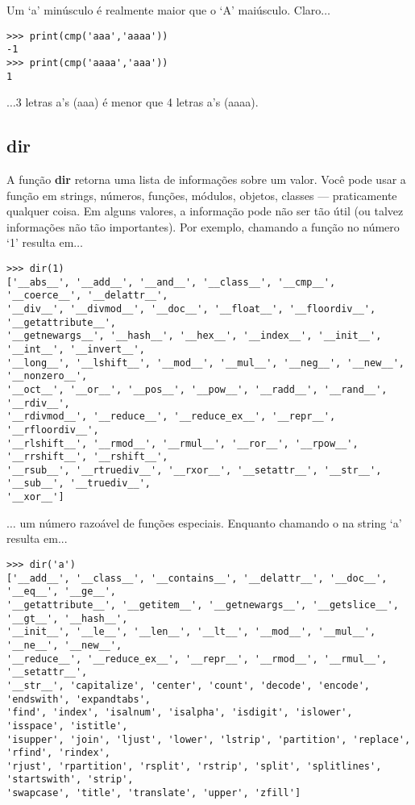 Um `a' minúsculo é realmente maior que o `A' maiúsculo. Claro$\ldots$

\begin{listing}
\begin{verbatim}
>>> print(cmp('aaa','aaaa'))
-1
>>> print(cmp('aaaa','aaa'))
1
\end{verbatim}
\end{listing}

\noindent
$\ldots$3 letras a's (aaa) é menor que 4 letras a's (aaaa).

\subsection*{dir}

A função \textbf{dir} retorna uma lista de informações sobre um valor. Você pode usar a função  em strings, números, funções, módulos, objetos, classes --- praticamente qualquer coisa. Em alguns valores, a informação pode não ser tão útil (ou talvez informações não tão importantes). Por exemplo, chamando a função  no número `1' resulta em$\ldots$

\begin{listingignore}
\begin{verbatim}
>>> dir(1)
['__abs__', '__add__', '__and__', '__class__', '__cmp__', '__coerce__', '__delattr__', 
'__div__', '__divmod__', '__doc__', '__float__', '__floordiv__', '__getattribute__', 
'__getnewargs__', '__hash__', '__hex__', '__index__', '__init__', '__int__', '__invert__', 
'__long__', '__lshift__', '__mod__', '__mul__', '__neg__', '__new__', '__nonzero__', 
'__oct__', '__or__', '__pos__', '__pow__', '__radd__', '__rand__', '__rdiv__', 
'__rdivmod__', '__reduce__', '__reduce_ex__', '__repr__', '__rfloordiv__', 
'__rlshift__', '__rmod__', '__rmul__', '__ror__', '__rpow__', '__rrshift__', '__rshift__',
'__rsub__', '__rtruediv__', '__rxor__', '__setattr__', '__str__', '__sub__', '__truediv__',
'__xor__']
\end{verbatim}
\end{listingignore}

$\ldots$ um número razoável de funções especiais. Enquanto chamando o  na string `a' resulta em...

\begin{listingignore}
\begin{verbatim}
>>> dir('a')
['__add__', '__class__', '__contains__', '__delattr__', '__doc__', '__eq__', '__ge__', 
'__getattribute__', '__getitem__', '__getnewargs__', '__getslice__', '__gt__', '__hash__',
'__init__', '__le__', '__len__', '__lt__', '__mod__', '__mul__', '__ne__', '__new__', 
'__reduce__', '__reduce_ex__', '__repr__', '__rmod__', '__rmul__', '__setattr__', 
'__str__', 'capitalize', 'center', 'count', 'decode', 'encode', 'endswith', 'expandtabs', 
'find', 'index', 'isalnum', 'isalpha', 'isdigit', 'islower', 'isspace', 'istitle', 
'isupper', 'join', 'ljust', 'lower', 'lstrip', 'partition', 'replace', 'rfind', 'rindex', 
'rjust', 'rpartition', 'rsplit', 'rstrip', 'split', 'splitlines', 'startswith', 'strip', 
'swapcase', 'title', 'translate', 'upper', 'zfill']
\end{verbatim}
\end{listingignore}

